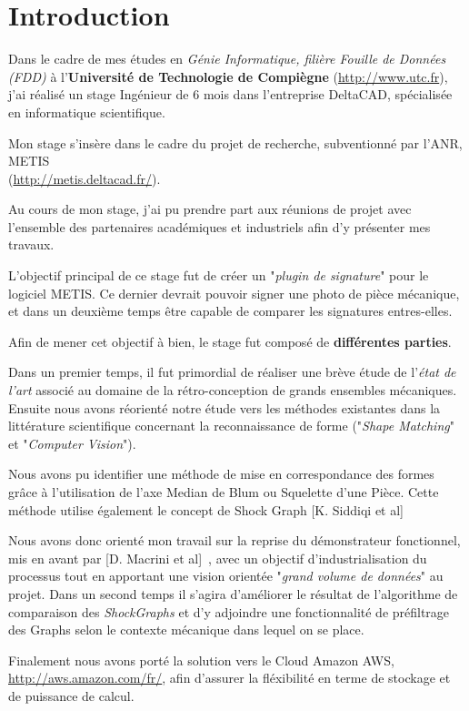\chapter*{Introduction}

Dans le cadre de mes études en \emph{Génie Informatique, filière Fouille de Données (FDD)} à l'\textbf{Université de Technologie de Compiègne} (\url{http://www.utc.fr}), j'ai réalisé un stage Ingénieur de 6 mois dans l'entreprise DeltaCAD, spécialisée en informatique scientifique. 


Mon stage s'insère dans le cadre du projet de recherche, subventionné par l'ANR, METIS \\(\url{http://metis.deltacad.fr/}).

Au cours de mon stage, j'ai pu prendre part aux réunions de projet avec l'ensemble des partenaires académiques et industriels afin d'y présenter mes travaux.

L'objectif principal de ce stage fut de créer un "\textit{plugin de signature}" pour le logiciel METIS. Ce dernier devrait pouvoir signer une photo de pièce mécanique, et dans un deuxième temps être capable de comparer les signatures entres-elles.

Afin de mener cet objectif à bien, le stage fut composé de \textbf{différentes parties}.

Dans un premier temps, il fut primordial de réaliser une brève étude de l'\textit{état de l'art} associé au domaine de la rétro-conception de grands ensembles mécaniques.
Ensuite nous avons réorienté notre étude vers les méthodes existantes dans la littérature scientifique concernant la reconnaissance de forme ("\textit{Shape Matching}" et "\textit{Computer Vision}").

Nous avons pu identifier une méthode de mise en correspondance des formes grâce à l'utilisation de l'axe Median de Blum ou Squelette d'une Pièce. Cette méthode utilise également le concept de Shock Graph [K. Siddiqi et al]~\cite{Siddiqi1999}

Nous avons donc orienté mon travail sur la reprise du démonstrateur fonctionnel, mis en avant par [D. Macrini et al]~\cite{Macrini2002}, avec un objectif d'industrialisation du processus tout en apportant une vision orientée "\textit{grand volume de données}" au projet.
Dans un second temps il s'agira d'améliorer le résultat de l'algorithme de comparaison des \textit{ShockGraphs} et d'y adjoindre une fonctionnalité de préfiltrage des Graphs selon le contexte mécanique dans lequel on se place.

Finalement nous avons porté la solution vers le Cloud Amazon AWS, \url{http://aws.amazon.com/fr/}, afin d'assurer la fléxibilité en terme de stockage et de puissance de calcul.


